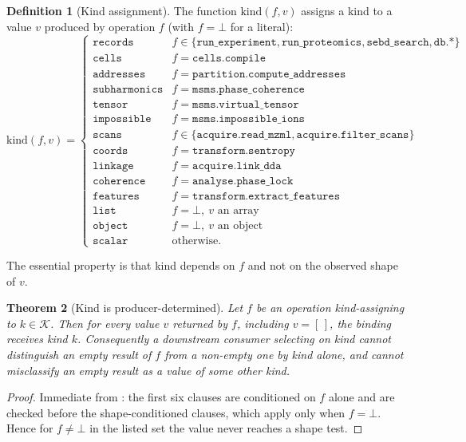 \documentclass[11pt,twocolumn,a4paper]{article}
\theoremstyle{ssthm}
\newtheorem{theorem}{Theorem}[section]
\theoremstyle{definition}
\newtheorem{definition}[theorem]{Definition}
\theoremstyle{remark}
\newcommand{\shk}[1]{\texttt{#1}}
\newcommand{\Kset}{\mathcal{K}}
\begin{document}
\begin{definition}[Kind assignment]
\label{def:classify}
The function $\mathrm{kind}(f, v)$ assigns a kind to a value $v$ produced
by operation $f$ (with $f=\bot$ for a literal):
\[
\mathrm{kind}(f,v)=
\begin{cases}
\shk{records} & f\in\{\shk{run\_experiment},\shk{run\_proteomics},
                     \shk{sebd\_search},\shk{db.*}\}\\
\shk{cells} & f=\shk{cells.compile}\\
\shk{addresses} & f=\shk{partition.compute\_addresses}\\
\shk{subharmonics} & f=\shk{msms.phase\_coherence}\\
\shk{tensor} & f=\shk{msms.virtual\_tensor}\\
\shk{impossible} & f=\shk{msms.impossible\_ions}\\
\shk{scans} & f\in\{\shk{acquire.read\_mzml},\shk{acquire.filter\_scans}\}\\
\shk{coords} & f=\shk{transform.sentropy}\\
\shk{linkage} & f=\shk{acquire.link\_dda}\\
\shk{coherence} & f=\shk{analyse.phase\_lock}\\
\shk{features} & f=\shk{transform.extract\_features}\\
\shk{list} & f=\bot,\ v \text{ an array}\\
\shk{object} & f=\bot,\ v \text{ an object}\\
\shk{scalar} & \text{otherwise.}
\end{cases}
\]
\end{definition}

The essential property is that kind depends on $f$ and not on the
observed shape of $v$.

\begin{theorem}[Kind is producer-determined]
\label{thm:kind-preservation}
Let $f$ be an operation kind-assigning to $k\in\Kset$. Then for every
value $v$ returned by $f$, including $v=[\,]$, the binding receives kind
$k$. Consequently a downstream consumer selecting on kind cannot
distinguish an empty result of $f$ from a non-empty one by kind alone,
and cannot misclassify an empty result as a value of some other kind.
\end{theorem}

\begin{proof}
Immediate from : the first six clauses are conditioned
on $f$ alone and are checked before the shape-conditioned clauses, which
apply only when $f=\bot$. Hence for $f\ne\bot$ in the listed set the
value never reaches a shape test.
\end{proof}
\end{document}
